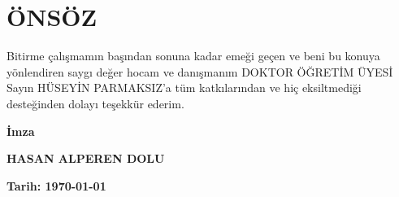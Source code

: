 \section*{ÖNSÖZ}
\vspace{.5cm}
Bitirme çalışmamın başından sonuna kadar emeği geçen ve beni bu konuya yönlendiren saygı değer hocam ve danışmanım DOKTOR ÖĞRETİM ÜYESİ Sayın HÜSEYİN PARMAKSIZ'a tüm katkılarından ve hiç eksiltmediği desteğinden dolayı teşekkür ederim.

\vspace{2cm}
\begin{flushright}
\begin{minipage}{5cm}
\begin{center}
\textbf{İmza}

\textbf{HASAN ALPEREN DOLU}

\textbf{Tarih: {\today}}\hfill
\end{center}
\end{minipage}
\end{flushright}
